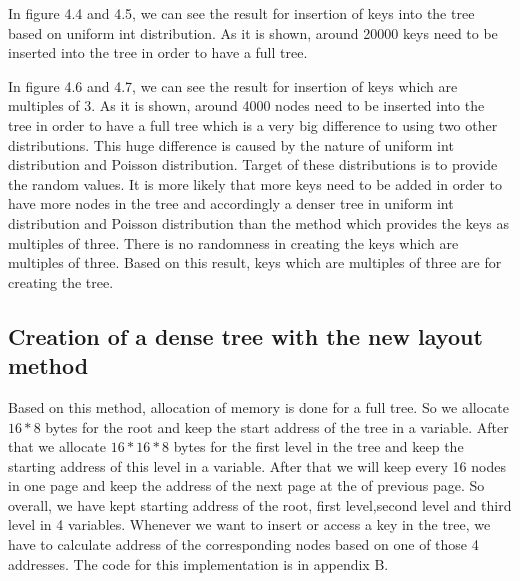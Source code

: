 \documentclass[12pt]{report}
\begin{document}
In figure 4.4 and 4.5, we can see the result for insertion of keys into the tree based on uniform int distribution. As it is shown, around 20000 keys need to be inserted into the tree in order to have a full tree. 

In figure 4.6 and 4.7, we can see the result for insertion of keys which are multiples of 3. As it is shown, around 4000 nodes need to be inserted into the tree in order to have a full tree which is a very big difference to using two other distributions. This huge difference is caused by the nature of uniform int distribution and Poisson distribution. Target of these distributions is to provide the random values. It is more likely that more keys need to be added in order to have more nodes in the tree and accordingly a denser tree in uniform int distribution and Poisson distribution than the method which provides the keys as multiples of three. There is no randomness in creating the keys which are multiples of three. Based on this result, keys which are multiples of three are for creating the tree.  




\subsection{Creation of a dense tree with the new layout method}

Based on this method, allocation of memory is done for a full tree. So we allocate $16*8$ bytes for the root and keep the start address of the tree in a variable. After that we allocate $16*16*8$ bytes for the first level in the tree and keep the starting address of this level in a variable. After that we will keep every 16 nodes in one page and keep the address of the next page at the of previous page. So overall, we have kept starting address of the root, first level,second level and third level in 4 variables. Whenever we want to insert or access a key in the tree, we have to calculate address of the corresponding nodes based on one of those 4 addresses. The code for this implementation is in appendix B.
\end{document}
